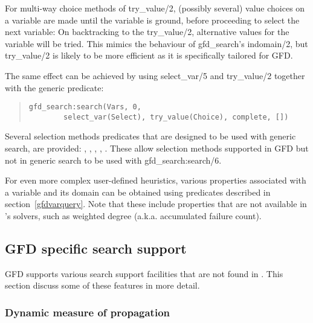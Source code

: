 For multi-way choice methods of try_value/2,  
(possibly several) value choices on a variable are made until the
variable is ground, before proceeding to select the next variable: On
backtracking to the try_value/2, alternative values for the variable
will be tried. This mimics the behaviour of gfd_search's indomain/2,
but try_value/2 is likely to be more efficient as it is specifically
tailored for GFD.

The same effect can be achieved by using select_var/5 and try_value/2
together with the generic
predicate:
\begin{quote}
\begin{verbatim}
gfd_search:search(Vars, 0,
        select_var(Select), try_value(Choice), complete, [])
\end{verbatim}
\end{quote}
\begin{sloppypar}
Several selection methods predicates that are designed to be used with
generic search, are provided:
, , ,
, .
These allow selection methods supported in GFD but not in generic search
to be used with gfd_search:search/6.
\end{sloppypar}

For even more complex user-defined heuristics, various properties associated
with a variable and its domain can be obtained using predicates described
in section~\ref{gfdvarquery}. Note that these include properties that are not
available in
\eclipse's solvers, such as weighted degree (a.k.a. accumulated failure count).

\subsection{GFD specific search support\label{addsearch}}

GFD supports various search support facilities that are not found in 
\eclipse. This section discuss some of these features in more detail.

\subsubsection{Dynamic measure of propagation\label{dynmeasure}}

